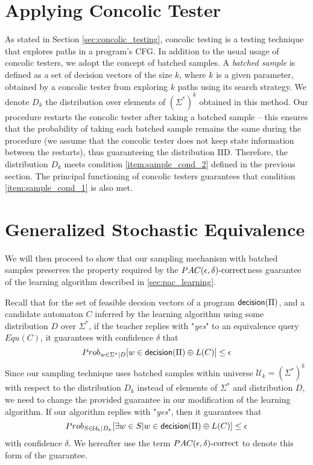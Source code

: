 \section{Applying Concolic Tester}\label{sec:apply_concolic}

As stated in Section \ref{sec:concolic_testing}, concolic testing is a testing technique that explores paths in a program's CFG. In addition to the usual usage of concolic testers, we adopt the concept of batched samples. A \emph{batched sample} is defined as a set of decision vectors of the size $k$, where $k$ is a given parameter, obtained by a concolic tester from exploring $k$ paths using its search strategy. We denote $D_k$ the distribution over elements of $(\Sigma^\ast)^k$ obtained in this method. Our procedure restarts the concolic tester after taking a batched sample -- this ensures that the probability of taking each batched sample remains the same during the procedure (we assume that the concolic tester does not keep state information between the restarts), thus guaranteeing the distribution IID. Therefore, the distribution $D_k$ meets condition \ref{item:sample_cond_2} defined in the previous section. The principal functioning of concolic testers guarantees that condition \ref{item:sample_cond_1} is also met. 

\section{Generalized Stochastic Equivalence}\label{sec:stochastic_eq}

We will then proceed to show that our sampling mechanism with batched samples preserves the property required by the $PAC(\epsilon, \delta)\text{-correct}$ness guarantee of the learning algorithm described in \ref{sec:pac_learning}.

Recall that for the set of feasible decsion vectors of a program $\mathsf{decision}(\Pi)$, and a candidate automaton $C$ inferred by the learning algorithm using some distribution $D$ over $\Sigma^\ast$, if the teacher replies with "\textit{yes}" to an equivalence query $Equ(C)$, it guarantees with confidence $\delta$ that 
\begin{equation}
Prob_{w \in \Sigma^\ast|D}[w \in \mathsf{decision}(\Pi) \oplus L(C)] \leq \epsilon
\end{equation}
Since our sampling technique uses batched samples within universe $\mathcal{U}_k = (\Sigma^\ast)^k$ with respect to the distribution $D_k$ instead of elements of $\Sigma^\ast$ and distribution $D$, we need to change the provided guarantee in our modification of the learning algorithm. If our algorithm replies with "\textit{yes}", then it guarantees that
\begin{equation}\label{eq:equ_pac}
Prob_{S \in \mathcal{U}_k|D_k}[\exists w \in S | w \in \mathsf{decision}(\Pi) \oplus L(C)] \leq \epsilon
\end{equation}
with confidence $\delta$. We hereafter use the term $PAC(\epsilon, \delta)\text{-correct}$ to denote this form of the guarantee. 

